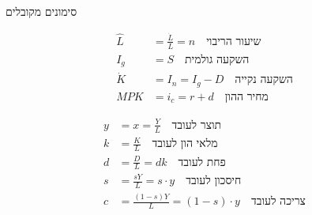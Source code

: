 \documentclass[usenames,dvipsnames]{beamer}
\begin{document}
\begin{RTL}
\begin{frame}[allowframebreaks]
    \framebreak



    \framebreak
    
    \begin{block}{סימונים מקובלים}
        \begin{minipage}[t]{0.5\textwidth}
            \begin{align*}
            \hat{L} &= \frac{\dot{L}}{L} = n \quad \text{שיעור הריבוי} \\
            I_g &= S \quad \text{השקעה גולמית} \\
            \dot{K} &= I_n = I_g - D \quad \text{השקעה נקייה}\\
            MPK &= i_c = r + d \quad \text{מחיר ההון}
            \end{align*}
        \end{minipage}%
        \begin{minipage}[t]{0.5\textwidth}
            \begin{align*}
            y &= x =  \frac{Y}{L} \quad \text{תוצר לעובד} \\
            k &= \frac{K}{L} \quad \text{מלאי הון לעובד} \\
            d &= \frac{D}{L} = dk \quad  \text{פחת לעובד} \\
            s &= \frac{sY}{L} = s \cdot y \quad \text{חיסכון לעובד} \\
            c &= \frac{(1-s)Y}{L} = (1 - s) \cdot y \quad \text{צריכה לעובד}
            \end{align*}
        \end{minipage}
    \end{block}


\end{frame}
\end{RTL}
\end{document}

